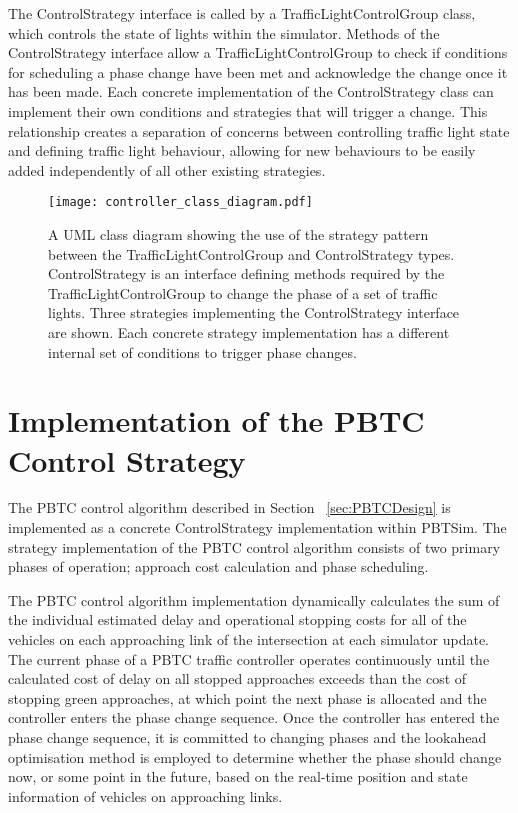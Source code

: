The ControlStrategy interface is called by a TrafficLightControlGroup class, which controls the state of lights within the simulator. Methods of the ControlStrategy interface allow a TrafficLightControlGroup to check if conditions for scheduling a phase change have been met and acknowledge the change once it has been made. Each concrete implementation of the ControlStrategy class can implement their own conditions and strategies that will trigger a change. This relationship creates a separation of concerns between controlling traffic light state and defining traffic light behaviour, allowing for new behaviours to be easily added independently of all other existing strategies. 

\begin{figure}[]
\centering
	\texttt{[image: controller\_class\_diagram.pdf]}
	\caption{ A UML class diagram showing the use of the strategy pattern between the TrafficLightControlGroup and ControlStrategy types. ControlStrategy is an interface defining methods required by the TrafficLightControlGroup to change the phase of a set of traffic lights. Three strategies implementing the ControlStrategy interface are shown. Each concrete strategy implementation has a different internal set of conditions to trigger phase changes. }
\label{controllerclassdiagram}
\end{figure}


\section{Implementation of the PBTC Control Strategy}

The PBTC control algorithm described in Section ~\ref{sec:PBTCDesign} is implemented as a concrete ControlStrategy implementation within PBTSim. The strategy implementation of the PBTC control algorithm consists of two primary phases of operation; approach cost calculation and phase scheduling. 

The PBTC control algorithm implementation dynamically calculates the sum of the individual estimated delay and operational stopping costs for all of the vehicles on each approaching link of the intersection at each simulator update. 
The current phase of a PBTC traffic controller operates continuously until the calculated cost of delay on all stopped approaches exceeds than the cost of stopping green approaches, at which point the next phase is allocated and the controller enters the phase change sequence. Once the controller has entered the phase change sequence, it is  committed to changing phases and the lookahead optimisation method is employed to determine whether the phase should change now, or some point in the future, based on the real-time position and state information of vehicles on approaching links. 

